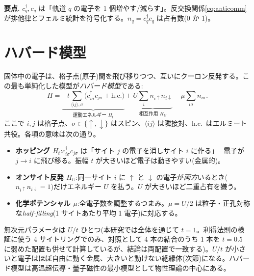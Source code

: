 \documentclass[11pt,a4paper]{ltjsarticle}
\newcommand{\cd}{c^\dagger}
\newcommand{\up}{\uparrow}
\newcommand{\dn}{\downarrow}
\begin{document}
\begin{keybox}
\textbf{要点.} $\cd_q,c_q$ は「軌道 $q$ の電子を 1 個増やす/減らす」。反交換関係\eqref{eq:anticomm}が排他律とフェルミ統計を符号化する。$n_q=\cd_q c_q$ は占有数(0 か 1)。
\end{keybox}

\section{ハバード模型}
\label{sec:hubbard}

固体中の電子は、格子点(原子)間を飛び移りつつ、互いにクーロン反発する。この最も単純化した模型が\emph{ハバード模型}である:
\begin{equation}
  H = \underbrace{-t\!\!\sum_{\langle ij\rangle,\sigma}\!\!\bigl(\cd_{i\sigma}c_{j\sigma}+\text{h.c.}\bigr)}_{\text{運動エネルギー }H_t}
    + \underbrace{U\sum_i n_{i\up}n_{i\dn}}_{\text{相互作用 }H_U}
    - \mu\sum_{i\sigma} n_{i\sigma}.
  \label{eq:hubbard}
\end{equation}
ここで $i,j$ は格子点、$\sigma\in\{\up,\dn\}$ はスピン、$\langle ij\rangle$ は隣接対、h.c.\ はエルミート共役。各項の意味は次の通り。
\begin{itemize}
  \item \textbf{ホッピング $H_t$}:$\cd_{i\sigma}c_{j\sigma}$ は「サイト $j$ の電子を消しサイト $i$ に作る」=電子が $j\to i$ に飛び移る。振幅 $t$ が大きいほど電子は動きやすい(金属的)。
  \item \textbf{オンサイト反発 $H_U$}:同一サイト $i$ に $\up$ と $\dn$ の電子が\emph{両方}いるとき($n_{i\up}n_{i\dn}=1$)だけエネルギー $U$ を払う。$U$ が大きいほど二重占有を嫌う。
  \item \textbf{化学ポテンシャル $\mu$}:全電子数を調整するつまみ。$\mu=U/2$ は粒子・正孔対称な\emph{half-filling}(1 サイトあたり平均 1 電子)に対応する。
\end{itemize}
無次元パラメータは $U/t$ ひとつ(本研究では全体を通じて $t=1$。利得法則の検証に使う 4 サイトリングでのみ、対照として 4 本の結合のうち 1 本を $t=0.5$ に弱めた配置も併せて計算しているが、結論は両配置で一致する)。$U/t$ が小さいと電子はほぼ自由に動く金属、大きいと動けない絶縁体(次節)になる。ハバード模型は高温超伝導・量子磁性の最小模型として物性理論の中心にある。
\end{document}
